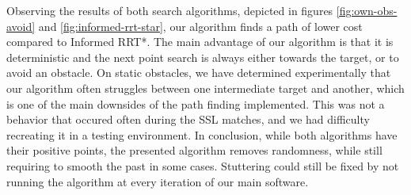 Observing the results of both search algorithms, depicted in figures \ref{fig:own-obs-avoid} and \ref{fig:informed-rrt-star},
our algorithm finds a path of lower cost compared to Informed RRT*. The main advantage of our algorithm is that it is deterministic
and the next point search is always either towards the target, or to avoid an obstacle.
On static obstacles, we have determined experimentally that our algorithm often struggles between one intermediate target and another,
which is one of the main downsides of the path finding implemented. This was not a behavior that occured often during the SSL matches,
and we had difficulty recreating it in a testing environment. In conclusion, while both algorithms have their positive points,
the presented algorithm removes randomness, while still requiring to smooth the past in some cases. Stuttering could still be fixed by
not running the algorithm at every iteration of our main software.